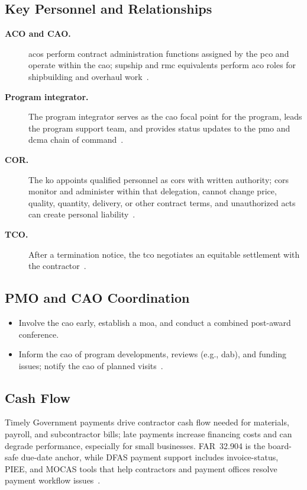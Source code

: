 \documentclass[../main.tex]{subfiles}
\begin{document}
\subsection{Key Personnel and Relationships}
\begin{description}
  \item[\textbf{ACO and CAO.}] \ac{aco}s perform contract administration functions assigned by the \ac{pco} and operate within the \ac{cao}; \ac{supship} and \ac{rmc} equivalents perform \ac{aco} roles for shipbuilding and overhaul work~\autocite{edo-3-2-6-contract-administration-2025,FAR-42-302-Contract-Administration}.
  \item[\textbf{Program integrator.}] The program integrator serves as the \ac{cao} focal point for the program, leads the program support team, and provides status updates to the \ac{pmo} and \ac{dcma} chain of command~\autocite{edo-3-2-6-contract-administration-2025}.
  \item[\textbf{COR.}] The \ac{ko} appoints qualified personnel as \ac{cor}s with written authority; \ac{cor}s monitor and administer within that delegation, cannot change price, quality, quantity, delivery, or other contract terms, and unauthorized acts can create personal liability~\autocite{FAR-1-602-2-Responsibilities,edo-3-2-6-contract-administration-2025}.
  \item[\textbf{TCO.}] After a termination notice, the \ac{tco} negotiates an equitable settlement with the contractor~\autocite{edo-3-2-6-contract-administration-2025,FAR-42-302-Contract-Administration}.
\end{description}

\subsection{PMO and CAO Coordination}
\begin{itemize}
  \item Involve the \ac{cao} early, establish a \ac{moa}, and conduct a combined post-award conference.
  \item Inform the \ac{cao} of program developments, reviews (e.g., \ac{dab}), and funding issues; notify the \ac{cao} of planned visits~\autocite{FAR-42-402-CAO-Visits,edo-3-2-6-contract-administration-2025}.
\end{itemize}

\subsection{Cash Flow}
Timely Government payments drive contractor cash flow needed for materials, payroll, and subcontractor bills; late payments increase financing costs and can degrade performance, especially for small businesses. FAR~32.904 is the board-safe due-date anchor, while DFAS payment support includes invoice-status, PIEE, and MOCAS tools that help contractors and payment offices resolve payment workflow issues~\autocite{edo-3-2-6-contract-administration-2025,FAR-32-904-Payment-Due-Dates,DFAS-Doing-Business-2026}.
\end{document}
